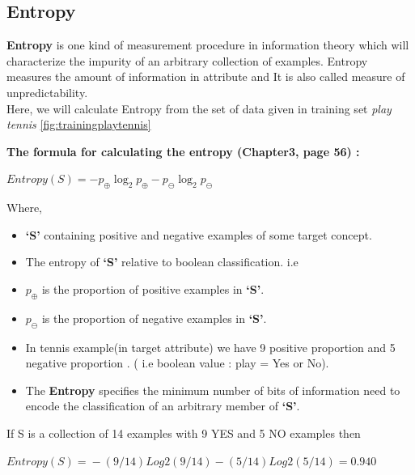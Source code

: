 \documentclass{report}
\begin{document}
\pagebreak

\subsection{Entropy}
\label{sec:inf}

\textbf{Entropy} is one kind of measurement procedure in information theory which will characterize the impurity of an arbitrary collection of examples. Entropy measures the amount of information in attribute and It is also called measure of unpredictability. \\
Here, we will calculate Entropy from the set of data given in training set \emph{play tennis} \ref{fig:trainingplaytennis}

\textbf{ The formula for calculating the entropy \cite{Mitchell1997MachineLearning}(Chapter3, page 56) :}\\

{\centering
 $\mathit{Entropy}(S)=-p_\oplus\log _{2}p_\oplus - p_\ominus\log _{2} p_\ominus$ 
\par}

Where,

\begin{itemize}

\item \textbf{`S'} containing positive and negative examples of some target concept.
\item The entropy of \textbf{`S'} relative to boolean classification. i.e
\item $\mathit{p_\oplus}$ is the proportion of positive examples in \textbf{`S'}. 
\item $\mathit{p_\ominus}$ is the proportion of negative examples in \textbf{`S'}.
\item In tennis example(in target attribute) we have 9 positive proportion and 5 negative proportion .  ( i.e boolean value : play = Yes or No).
\item The \textbf{Entropy} specifies the minimum number of bits of information need to encode the classification of an arbitrary member of \textbf{`S'}.

\end{itemize}

If S is a collection of 14 examples with 9 YES and 5 NO examples then\\

{\centering
$\mathit{Entropy}(S) = {}- (9/14) Log{2} (9/14) {}- (5/14) Log{2} (5/14) = 0.940$
\par}
\end{document}
